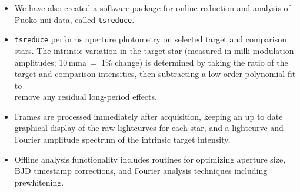 \vspace{-1.75cm}
\begin{itemize}[itemsep=20pt]
\item[] We have also created a software package for online reduction and analysis
of Puoko-nui data, called \texttt{tsreduce}.


\item[] \texttt{tsreduce} performs aperture photometry on selected target and
comparison stars. The intrinsic variation in the target star (measured in
milli-modulation amplitudes; 10\,mma~=~1\% change) is determined by taking the
ratio of the target and comparison intensities, then subtracting a low-order 
polynomial fit to\\remove any residual long-period effects.

\item[] Frames are processed immediately after acquisition, keeping an up to date
graphical display of the raw lightcurves for each star, and a lightcurve and Fourier
amplitude spectrum of the intrinsic target intensity.

\item[] Offline analysis functionality includes routines for optimizing aperture size,
BJD timestamp corrections, and Fourier analysis techniques including prewhitening.


\end{itemize}
\vspace{-1.75cm}